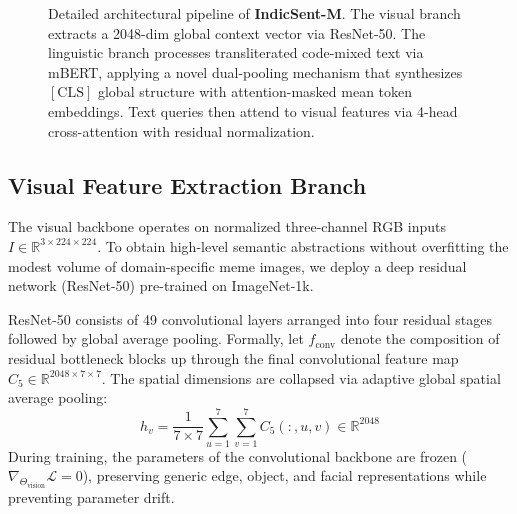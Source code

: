 \documentclass[10pt,journal,compsoc]{IEEEtran}
\begin{document}
\begin{figure}[!t]
\caption{Detailed architectural pipeline of \textbf{IndicSent-M}. The visual branch extracts a 2048-dim global context vector via ResNet-50. The linguistic branch processes transliterated code-mixed text via mBERT, applying a novel dual-pooling mechanism that synthesizes $[\text{CLS}]$ global structure with attention-masked mean token embeddings. Text queries then attend to visual features via 4-head cross-attention with residual normalization.}
\label{fig:architecture_detailed}
\end{figure}

\subsection{Visual Feature Extraction Branch}
The visual backbone operates on normalized three-channel RGB inputs $I \in \mathbb{R}^{3 \times 224 \times 224}$. To obtain high-level semantic abstractions without overfitting the modest volume of domain-specific meme images, we deploy a deep residual network (ResNet-50) \cite{he2016deep} pre-trained on ImageNet-1k.

ResNet-50 consists of 49 convolutional layers arranged into four residual stages followed by global average pooling. Formally, let $f_{\text{conv}}$ denote the composition of residual bottleneck blocks up through the final convolutional feature map $C_5 \in \mathbb{R}^{2048 \times 7 \times 7}$. The spatial dimensions are collapsed via adaptive global spatial average pooling:
\begin{equation}
    h_v = \frac{1}{7 \times 7} \sum_{u=1}^{7} \sum_{v=1}^{7} C_{5}(:, u, v) \in \mathbb{R}^{2048}
\end{equation}
During training, the parameters of the convolutional backbone are frozen ($\nabla_{\Theta_{\text{vision}}} \mathcal{L} = 0$), preserving generic edge, object, and facial representations while preventing parameter drift.
\end{document}
